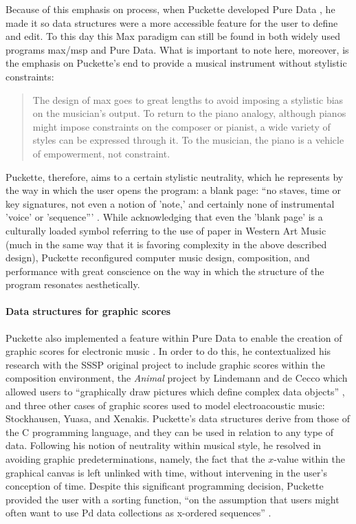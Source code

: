 	Because of this emphasis on process, when Puckette developed Pure Data \parencite{icmc/bbp2372.1997.060}, he made it so data structures were a more accessible feature for the user to define and edit. To this day this Max paradigm \parencite{DBLP:journals/comj/Puckette02} can still be found in both widely used programs \gls{max/msp} \parencite{DBLP:conf/icmc/Zicarelli98} and Pure Data. What is important to note here, moreover, is the emphasis on Puckette's end to provide a musical instrument without stylistic constraints:

	\begin{quote}
		The design of \gls{max} goes to great lengths to avoid imposing a stylistic bias on the musician's output. To return to the piano analogy, although pianos might impose constraints on the composer or pianist, a wide variety of styles can be expressed through it. To the musician, the piano is a vehicle of empowerment, not constraint. \parencite{DBLP:journals/comj/Puckette02}
	\end{quote}

	Puckette, therefore, aims to a certain stylistic neutrality, which he represents by the way in which the user opens the program: a blank page: ``no staves, time or key signatures, not even a notion of 'note,' and certainly none of instrumental 'voice' or 'sequence''' \parencite{DBLP:journals/comj/Puckette02}. While acknowledging that even the 'blank page' is a culturally loaded symbol referring to the use of paper in Western Art Music (much in the same way that it is favoring complexity in the above described design), Puckette reconfigured computer music design, composition, and performance with great conscience on the way in which the structure of the program resonates aesthetically.

	\paragraph{Data structures for graphic scores}
	\label{computer:datastructures}

	Puckette also implemented a feature within Pure Data to enable the creation of graphic scores for electronic music \parencite{DBLP:conf/icmc/Puckette02}. In order to do this, he contextualized his research with the SSSP original project to include graphic scores within the composition environment, the \textit{Animal} project by Lindemann and de Cecco which allowed users to ``graphically draw pictures which define complex data objects'' \parencite{DBLP:conf/icmc/Lindemann90a}, and three other cases of graphic scores used to model electroacoustic music: Stockhausen, Yuasa, and Xenakis. Puckette's data structures derive from those of the C programming language, and they can be used in relation to any type of data. Following his notion of neutrality within musical style, he resolved in avoiding graphic predeterminations, namely, the fact that the $x$-value within the graphical canvas is left unlinked with time, without intervening in the user's conception of time. Despite this significant programming decision, Puckette provided the user with a sorting function, ``on the assumption that users might often want to use Pd data collections as x-ordered sequences'' \parencite{DBLP:conf/icmc/Puckette02}.

